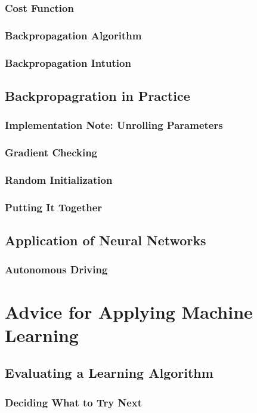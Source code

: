 \documentclass{article}
\begin{document}
\subsubsection{Cost Function}
\subsubsection{Backpropagation Algorithm}
\subsubsection{Backpropagation Intution}
\subsection{Backpropagration in Practice}
\subsubsection{Implementation Note: Unrolling Parameters}
\subsubsection{Gradient Checking}
\subsubsection{Random Initialization}
\subsubsection{Putting It Together}
\subsection{Application of Neural Networks}
\subsubsection{Autonomous Driving}

\newpage

\section{Advice for Applying Machine Learning}
\subsection{Evaluating a Learning Algorithm}
\subsubsection{Deciding What to Try Next}
\end{document}

